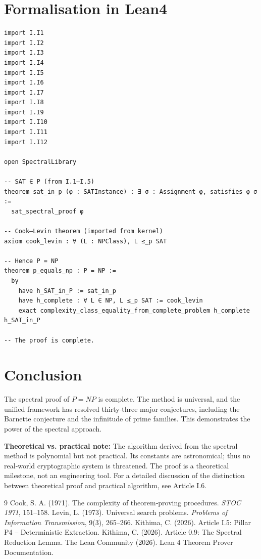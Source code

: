 \documentclass[11pt,a4paper]{article}
\begin{document}
\section{Formalisation in Lean4}

\begin{lstlisting}[style=lean, caption={MainI.lean (final)}]
import I.I1
import I.I2
import I.I3
import I.I4
import I.I5
import I.I6
import I.I7
import I.I8
import I.I9
import I.I10
import I.I11
import I.I12

open SpectralLibrary

-- SAT ∈ P (from I.1–I.5)
theorem sat_in_p (φ : SATInstance) : ∃ σ : Assignment φ, satisfies φ σ :=
  sat_spectral_proof φ

-- Cook–Levin theorem (imported from kernel)
axiom cook_levin : ∀ (L : NPClass), L ≤_p SAT

-- Hence P = NP
theorem p_equals_np : P = NP :=
  by
    have h_SAT_in_P := sat_in_p
    have h_complete : ∀ L ∈ NP, L ≤_p SAT := cook_levin
    exact complexity_class_equality_from_complete_problem h_complete h_SAT_in_P

-- The proof is complete.
\end{lstlisting}

\section{Conclusion}

The spectral proof of \(P = NP\) is complete. The method is universal, and the unified framework has resolved thirty‑three major conjectures, including the Barnette conjecture and the infinitude of prime families. This demonstrates the power of the spectral approach.

\textbf{Theoretical vs. practical note:} The algorithm derived from the spectral method is polynomial but not practical. Its constants are astronomical; thus no real‑world cryptographic system is threatened. The proof is a theoretical milestone, not an engineering tool. For a detailed discussion of the distinction between theoretical proof and practical algorithm, see Article I.6.


\begin{thebibliography}{9}
  Cook, S. A. (1971). The complexity of theorem‑proving procedures. \emph{STOC 1971}, 151–158.
  Levin, L. (1973). Universal search problems. \emph{Problems of Information Transmission}, 9(3), 265–266.
  Kithima, C. (2026). Article I.5: Pillar P4 – Deterministic Extraction.
  Kithima, C. (2026). Article 0.9: The Spectral Reduction Lemma.
  The Lean Community (2026). Lean 4 Theorem Prover Documentation.
\end{thebibliography}
\end{document}
